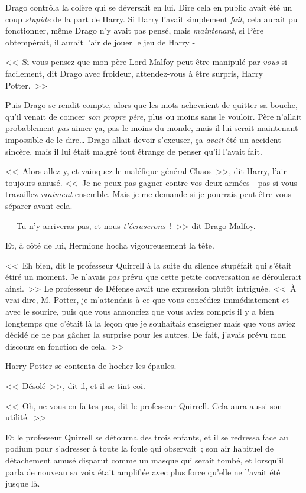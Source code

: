 Drago contrôla la colère qui se déversait en lui. Dire cela en public avait été un coup \emph{stupide} de la part de Harry. Si Harry l'avait simplement \emph{fait}, cela aurait pu fonctionner, même Drago n'y avait pas pensé, mais \emph{maintenant}, si Père obtempérait, il aurait l'air de jouer le jeu de Harry -

<<~Si vous pensez que mon père Lord Malfoy peut-être manipulé par \emph{vous} si facilement, dit Drago avec froideur, attendez-vous à être surpris, Harry Potter.~>>

Puis Drago se rendit compte, alors que les mots achevaient de quitter sa bouche, qu'il venait de coincer \emph{son propre père}, plus ou moins sans le vouloir. Père n'allait probablement \emph{pas} aimer ça, pas le moins du monde, mais il lui serait maintenant impossible de le dire… Drago allait devoir s'excuser, ça \emph{avait} été un accident sincère, mais il lui était malgré tout étrange de penser qu'il l'avait fait.

<<~Alors allez-y, et vainquez le maléfique général Chaos~>>, dit Harry, l'air toujours amusé. <<~Je ne peux pas gagner contre vos deux armées - pas si vous travaillez \emph{vraiment} ensemble. Mais je me demande si je pourrais peut-être vous séparer avant cela.

--- Tu n'y arriveras pas, et nous \emph{t'écraserons}~!~>> dit Drago Malfoy.

Et, à côté de lui, Hermione hocha vigoureusement la tête.

<<~Eh bien, dit le professeur Quirrell à la suite du silence stupéfait qui s'était étiré un moment. Je n'avais \emph{pas} prévu que cette petite conversation se déroulerait ainsi.~>> Le professeur de Défense avait une expression plutôt intriguée. <<~À vrai dire, M. Potter, je m'attendais à ce que vous concédiez immédiatement et avec le sourire, puis que vous annonciez que vous aviez compris il y a bien longtemps que c'était là la leçon que je souhaitais enseigner mais que vous aviez décidé de ne pas gâcher la surprise pour les autres. De fait, j'avais prévu mon discours en fonction de cela.~>>

Harry Potter se contenta de hocher les épaules.

<<~Désolé~>>, dit-il, et il se tint coi.

<<~Oh, ne vous en faites pas, dit le professeur Quirrell. Cela aura aussi son utilité.~>>

Et le professeur Quirrell se détourna des trois enfants, et il se redressa face au podium pour s'adresser à toute la foule qui observait~; son air habituel de détachement amusé disparut comme un masque qui serait tombé, et lorsqu'il parla de nouveau sa voix était amplifiée avec plus force qu'elle ne l'avait été jusque là.

